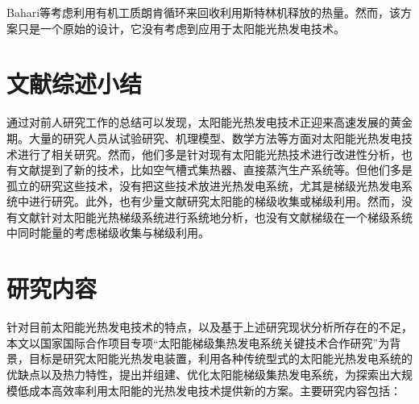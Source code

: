 Bahari等\cite{Bahari2016}考虑利用有机工质朗肯循环来回收利用斯特林机释放的热量。然而，该方案只是一个原始的设计，它没有考虑到应用于太阳能光热发电技术。


\section{文献综述小结}
通过对前人研究工作的总结可以发现，太阳能光热发电技术正迎来高速发展的黄金期。大量的研究人员从试验研究、机理模型、数学方法等方面对太阳能光热发电技术进行了相关研究。然而，他们多是针对现有太阳能光热技术进行改进性分析，也有文献提到了新的技术，比如空气槽式集热器、直接蒸汽生产系统等。但他们多是孤立的研究这些技术，没有把这些技术放进光热发电系统，尤其是梯级光热发电系统中进行研究。此外，也有少量文献研究太阳能的梯级收集或梯级利用。然而，没有文献针对太阳能光热梯级系统进行系统地分析，也没有文献梯级在一个梯级系统中同时能量的考虑梯级收集与梯级利用。

\section{研究内容}
\label{sec:researchContent}

针对目前太阳能光热发电技术的特点，以及基于上述研究现状分析所存在的不足，本文以国家国际合作项目专项“太阳能梯级集热发电系统关键技术合作研究”为背景，目标是研究太阳能光热发电装置，利用各种传统型式的太阳能光热发电系统的优缺点以及热力特性，提出并组建、优化太阳能梯级集热发电系统，为探索出大规模低成本高效率利用太阳能的光热发电技术提供新的方案。主要研究内容包括：

